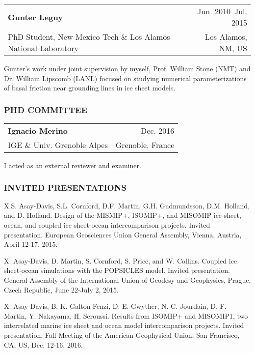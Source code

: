 \documentclass[12pt,letterpaper]{article}
\begin{document}
\begin{flushleft}
\begin{tabularx}{\textwidth}{@{} X r@{} }
{\bf Gunter Leguy} &  Jun. 2010--Jul. 2015 \\
PhD Student, New Mexico Tech \& Los Alamos National Laboratory & Los Alamos, NM, US
\end{tabularx}

\vspace{4pt}

Gunter's work under joint supervision by myself, Prof. William Stone (NMT) and Dr. William Lipscomb (LANL) focused on studying numerical parameterizations of basal friction near grounding lines in ice sheet models. 

\subsubsection*{\color{titleBlue} PHD COMMITTEE} 

\begin{tabularx}{\textwidth}{@{} X r@{} }
{\bf Ignacio Merino} &  Dec. 2016 \\
IGE \& Univ. Grenoble Alpes & Grenoble, France
\end{tabularx}
\vspace{4pt}

I acted as an external reviewer and examiner.


\subsubsection*{\color{titleBlue} INVITED PRESENTATIONS}
\vspace{-5pt}
\begin{enumerate*}
\item X.S. Asay-Davis, S.L. Cornford, D.F. Martin, G.H. Gudmundsson, D.M. Holland,
and D. Holland. Design of the MISMIP+, ISOMIP+, and MISOMIP ice-sheet, ocean, and coupled ice sheet-ocean intercomparison projects. Invited presentation. European Geosciences Union General Assembly, Vienna, Austria, April 12-17, 2015.
\item X. Asay-Davis, D. Martin, S. Cornford, S. Price, and W. Collins. Coupled ice sheet-ocean simulations with the POPSICLES model. Invited presentation. General Assembly of the International Union of Geodesy and Geophysics, Prague, Czech Republic, June 22-July 2, 2015.
\item X. Asay-Davis, B. K. Galton-Fenzi, D. E. Gwyther, N. C. Jourdain, D. F. Martin, Y. Nakayama, H. Seroussi. Results from ISOMIP+ and MISOMIP1, two interrelated marine ice sheet and ocean model intercomparison projects. Invited presentation. Fall Meeting of the American Geophysical Union, San Francisco, CA, US, Dec. 12-16, 2016.
\end{enumerate*}


\end{flushleft}
\end{document}
